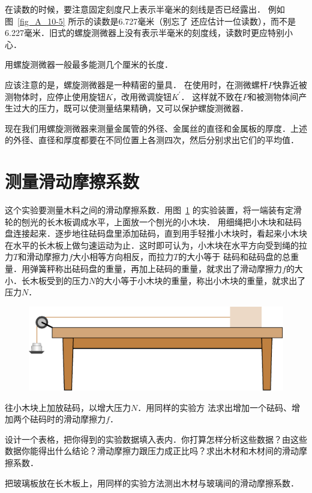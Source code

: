 在读数的时候，要注意固定刻度尺上表示半毫米的刻线是否已经露出．
例如图~\ref{fig_A_10-5} 所示的读数是6.727毫米（别忘了
还应估计一位读数），而不是6.227毫米．旧式的螺旋测微器上没有表示半毫米的刻度线，读数时更应特别小心．

用螺旋测微器一般最多能测几个厘米的长度．

应该注意的是，螺旋测微器是一种精密的量具．
在使用时，在测微螺杆$P$快靠近被测物体时，应停止使用旋钮$K$，改用微调旋钮$K^{\prime}$．
这样就不致在$P$和被测物体间产生过大的压力，既可以使测量结果精确，又可以保护螺旋测微器．

现在我们用螺旋测微器来测量金属管的外径、金属丝的直径和金属板的厚度．上述的外径、直径和厚度都要在不同位置上各测四次，然后分别求出它们的平均值．

\section{测量滑动摩擦系数}

这个实验要测量木料之间的滑动摩擦系数．用图~\ref{fig_A_10-6} 的实验装置，将一端装有定滑轮的刨光的长木板调成水平，上面放一个刨光的小木块．
用细绳把小木块和砝码盘连接起来．逐步地往砝码盘里添加砝码，直到用手轻推小木块时，看起来小木块在水平的长木板上做匀速运动为止．这时即可认为，小木块在水平方向受到绳的拉力$T$和滑动摩擦力$f$大小相等方向相反，而拉力$T$的大小等于	
砝码和砝码盘的总重量．用弹簧秤称出砝码盘的重量，再加上砝码的重量，就求出了滑动摩擦力$f$的大小．长木板受到的压力$N$的大小等于小木块的重量，称出小木块的重量，就求出了压力$N$．
\begin{figure}[htbp]
    \centering
    \includegraphics{fig/A/10-6.pdf}
    \caption{}\label{fig_A_10-6}
\end{figure}

往小木块上加放砝码，以增大压力$N$．用同样的实验方
法求出增加一个砝码、增加两个砝码时的滑动摩擦力$f$．

设计一个表格，把你得到的实验数据填入表内．你打算怎样分析这些数据？由这些数据你能得出什么结论？滑动摩擦力跟压力成正比吗？求出木材和木材间的滑动摩擦系数．

把玻璃板放在长木板上，用同样的实验方法测出木材与玻璃间的滑动摩擦系数．

